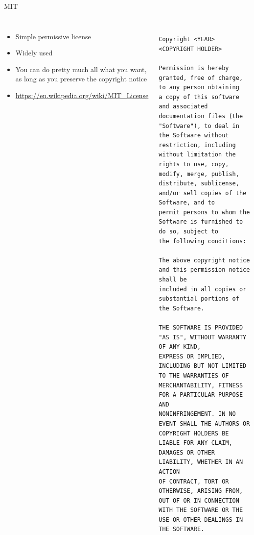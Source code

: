 \begin{frame}[fragile]{MIT}
  \begin{columns}
    \begin{itemize}
    \item Simple permissive license
    \item Widely used
    \item You can do pretty much all what you want, as long as you
      preserve the copyright notice
    \item \url{https://en.wikipedia.org/wiki/MIT_License}
    \end{itemize}
    \begin{block}{}
      {\tiny
\begin{verbatim}

Copyright <YEAR> <COPYRIGHT HOLDER>

Permission is hereby granted, free of charge, to any person obtaining
a copy of this software and associated documentation files (the
"Software"), to deal in the Software without restriction, including
without limitation the rights to use, copy, modify, merge, publish,
distribute, sublicense, and/or sell copies of the Software, and to
permit persons to whom the Software is furnished to do so, subject to
the following conditions:

The above copyright notice and this permission notice shall be
included in all copies or substantial portions of the Software.

THE SOFTWARE IS PROVIDED "AS IS", WITHOUT WARRANTY OF ANY KIND,
EXPRESS OR IMPLIED, INCLUDING BUT NOT LIMITED TO THE WARRANTIES OF
MERCHANTABILITY, FITNESS FOR A PARTICULAR PURPOSE AND
NONINFRINGEMENT. IN NO EVENT SHALL THE AUTHORS OR COPYRIGHT HOLDERS BE
LIABLE FOR ANY CLAIM, DAMAGES OR OTHER LIABILITY, WHETHER IN AN ACTION
OF CONTRACT, TORT OR OTHERWISE, ARISING FROM, OUT OF OR IN CONNECTION
WITH THE SOFTWARE OR THE USE OR OTHER DEALINGS IN THE SOFTWARE.
\end{verbatim}
      }
    \end{block}
  \end{columns}
\end{frame}

